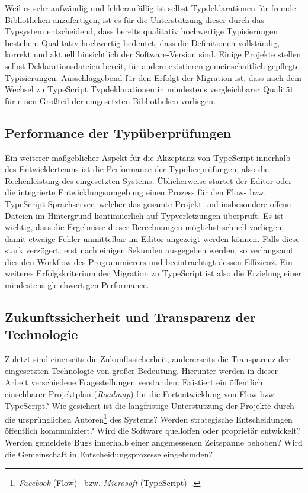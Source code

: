 Weil es sehr aufwändig und fehleranfällig ist selbst Typdeklarationen für fremde Bibliotheken anzufertigen, ist es für die Unterstützung dieser durch das Typsystem entscheidend, dass bereits qualitativ hochwertige Typisierungen bestehen. Qualitativ hochwertig bedeutet, dass die Definitionen vollständig, korrekt und aktuell hinsichtlich der Software-Version sind. Einige Projekte stellen selbst Deklarationsdateien bereit, für andere existieren gemeinschaftlich gepflegte Typisierungen. Ausschlaggebend für den Erfolgt der Migration ist, dass nach dem Wechsel zu TypeScript Typdeklarationen in mindestens vergleichbarer Qualität für einen Großteil der eingesetzten Bibliotheken vorliegen.

\subsection{Performance der Typüberprüfungen}

Ein weiterer maßgeblicher Aspekt für die Akzeptanz von TypeScript innerhalb des Entwicklerteams ist die Performance der Typüberprüfungen, also die Rechenleistung des eingesetzten Systems. Üblicherweise startet der Editor oder die integrierte Entwicklungsumgebung einen Prozess für den Flow- bzw. TypeScript-Sprachserver, welcher das gesamte Projekt und insbesondere offene Dateien im Hintergrund kontinuierlich auf Typverletzungen überprüft. Es ist wichtig, dass die Ergebnisse dieser Berechnungen möglichst schnell vorliegen, damit etwaige Fehler unmittelbar im Editor angezeigt werden können. Falls diese stark verzögert, erst nach einigen Sekunden ausgegeben werden, so verlangsamt dies den Workflow des Programmierers und beeinträchtigt dessen Effizienz. Ein weiteres Erfolgskriterium der Migration zu TypeScript ist also die Erzielung einer mindestens gleichwertigen Performance.

\subsection{Zukunftssicherheit und Transparenz der Technologie}

Zuletzt sind einerseits die Zukunftssicherheit, andererseits die Transparenz der eingesetzten Technologie von großer Bedeutung. Hierunter werden in dieser Arbeit verschiedene Fragestellungen verstanden: Existiert ein öffentlich einsehbarer Projektplan (\textit{Roadmap}) für die Fortentwicklung von Flow bzw. TypeScript? Wie gesichert ist die langfristige Unterstützung der Projekte durch die ursprünglichen Autoren\footnote{\textit{Facebook} (Flow)~\autocite{FLOW:PAPER} bzw. \emph{Microsoft} (TypeScript)~\autocite{TYPESCRIPT:SPEC}.} des Systems? Werden strategische Entscheidungen öffentlich kommuniziert? Wird die Software quelloffen oder proprietär entwickelt? Werden gemeldete Bugs innerhalb einer angemessenen Zeitspanne behoben? Wird die Gemeinschaft in Entscheidungsprozesse eingebunden?

